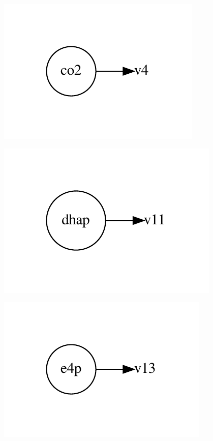 \documentclass{scrartcl}
\begin{document}
\begin{minipage}{0.33\linewidth}
\includegraphics[max width=\linewidth]{metabolic_maps/co2.pdf}
\end{minipage}
\begin{minipage}{0.33\linewidth}
\includegraphics[max width=\linewidth]{metabolic_maps/dhap.pdf}
\end{minipage}
\begin{minipage}{0.33\linewidth}
\includegraphics[max width=\linewidth]{metabolic_maps/e4p.pdf}
\end{minipage}
\end{document}
